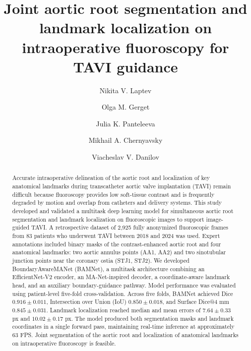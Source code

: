 \documentclass[preprint,12pt,authoryear]{elsarticle}
\begin{document}
\begin{frontmatter}

\title{Joint aortic root segmentation and landmark localization on intraoperative fluoroscopy for TAVI guidance}

\author[label1]{Nikita V. Laptev}

\author[label2]{Olga M. Gerget}

\author[label3]{Julia K. Panteleeva}

\author[label3]{Mikhail A. Chernyavsky}

\author[label4]{Viacheslav V. Danilov}


\address[label1]{Siberian State Medical University, Moskovsky Trakt 2, Tomsk 634050, Russia}
\address[label2]{V.A. Trapeznikov Institute of Control Sciences of Russian Academy of Sciences, Profsoyuznaya Street 65, Moscow 117997, Russia}
\address[label3]{Almazov National Medical Research Centre, Akkuratova Street 2, Saint Petersburg 197341, Russia}
\address[label4]{Pompeu Fabra University, Carrer de la Merc\`{e} 12, 08002 Barcelona, Spain}

\begin{abstract}
Accurate intraoperative delineation of the aortic root and localization of key anatomical landmarks during transcatheter aortic valve implantation (TAVI) remain difficult because fluoroscopy provides low soft-tissue contrast and is frequently degraded by motion and overlap from catheters and delivery systems. This study developed and validated a multitask deep learning model for simultaneous aortic root segmentation and landmark localization on fluoroscopic images to support image-guided TAVI. A retrospective dataset of 2,925 fully anonymized fluoroscopic frames from 83 patients who underwent TAVI between 2018 and 2024 was used. Expert annotations included binary masks of the contrast-enhanced aortic root and four anatomical landmarks: two aortic annulus points (AA1, AA2) and two sinotubular junction points near the coronary ostia (STJ1, STJ2). We developed BoundaryAwareMANet (BAMNet), a multitask architecture combining an EfficientNet-V2 encoder, an MA-Net-inspired decoder, a coordinate-aware landmark head, and an auxiliary boundary-guidance pathway. Model performance was evaluated using patient-level five-fold cross-validation. Across five folds, BAMNet achieved Dice $0.916 \pm 0.011$, Intersection over Union (IoU) $0.850 \pm 0.018$, and Surface Dice@4 mm $0.845 \pm 0.031$. Landmark localization reached median and mean errors of $7.64 \pm 0.33$ px and $10.02 \pm 0.17$ px. The model produced both segmentation masks and landmark coordinates in a single forward pass, maintaining real-time inference at approximately 63 FPS. Joint segmentation of the aortic root and localization of anatomical landmarks on intraoperative fluoroscopy is feasible.
\end{abstract}


\end{frontmatter}
\end{document}
